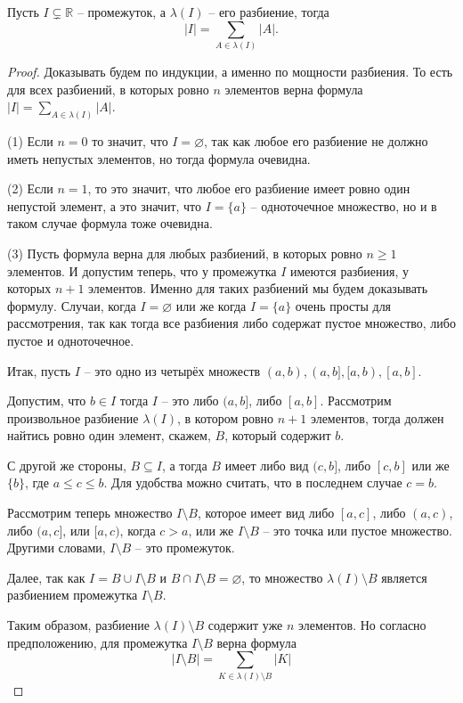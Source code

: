 \begin{theorem}\label{additive_of_lenght}
    Пусть $I\subsetneq \mathbb{R}$ -- промежуток, а $\lambda(I)$ -- его разбиение, тогда
    \[
     |I| = \sum_{A \in \lambda(I)}|A|.
    \]
\end{theorem}
\begin{proof}
Доказывать будем по индукции, а именно по мощности разбиения. То есть для всех разбиений, в которых ровно $n$ элементов верна формула $|I| = \sum_{A \in \lambda(I)}|A|$.

(1) Если $n =0$ то значит, что $I = \varnothing$, так как любое его разбиение не должно иметь непустых элементов, но тогда формула очевидна.

(2) Если $n=1$, то это значит, что любое его разбиение имеет ровно один непустой элемент, а это значит, что $I = \{a\}$ -- одноточечное множество, но и в таком случае формула тоже очевидна.

(3) Пусть формула верна для любых разбиений, в которых ровно $n\ge 1$ элементов. И допустим теперь, что у промежутка $I$ имеются разбиения, у которых $n+1$ элементов. Именно для таких разбиений мы будем доказывать формулу. Случаи, когда $I = \varnothing$ или же когда $I = \{a\}$ очень просты для рассмотрения, так как тогда все разбиения либо содержат пустое множество, либо пустое и одноточечное.

Итак, пусть $I$ -- это одно из четырёх множеств $(a,b), (a,b], [a,b), [a,b]$.

Допустим, что $b \in I$ тогда $I$ -- это либо $(a,b]$, либо $[a,b]$. Рассмотрим произвольное разбиение $\lambda(I)$, в котором ровно $n+1$ элементов, тогда должен найтись ровно один элемент, скажем, $B$, который содержит $b$.

С другой же стороны, $B \subseteq I$, а тогда $B$ имеет либо вид $(c,b]$, либо $[c,b]$ или же $\{b\}$, где $a \le c \le b$. Для удобства можно считать, что в последнем случае $c =b$.

Рассмотрим теперь множество $I \setminus B$, которое имеет вид либо $[a,c]$, либо $(a,c)$, либо $(a,c]$, или $[a,c)$, когда $c >a$, или же $I \setminus B$ -- это точка или пустое множество. Другими словами, $I\setminus B$ -- это промежуток. 

Далее, так как $I = B \cup I \setminus B$ и $B \cap I \setminus B = \varnothing$, то множество $\lambda(I) \setminus B$ является разбиением промежутка $I\setminus B$. 

Таким образом, разбиение $\lambda(I)\setminus B$ содержит уже $n$ элементов. Но согласно предположению, для промежутка $I \setminus B$ верна формула
\[
 |I \setminus B| = \sum_{K \in \lambda(I) \setminus B} |K|
\]


\end{proof}
